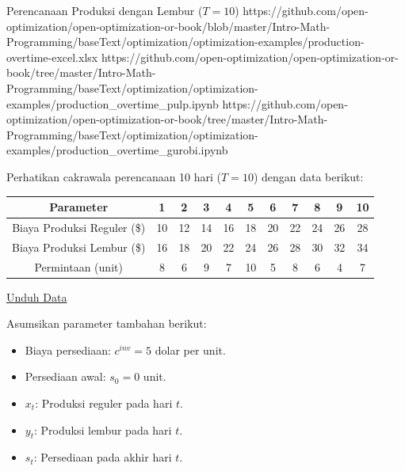 \begin{examplewithallcode}{Perencanaan Produksi dengan Lembur (\(T = 10\))}
{https://github.com/open-optimization/open-optimization-or-book/blob/master/Intro-Math-Programming/baseText/optimization/optimization-examples/production-overtime-excel.xlsx}
{https://github.com/open-optimization/open-optimization-or-book/tree/master/Intro-Math-Programming/baseText/optimization/optimization-examples/production_overtime_pulp.ipynb}
{https://github.com/open-optimization/open-optimization-or-book/tree/master/Intro-Math-Programming/baseText/optimization/optimization-examples/production_overtime_gurobi.ipynb}

Perhatikan cakrawala perencanaan 10 hari (\(T=10\)) dengan data berikut:


\begin{center}
\begin{tabular}{@{}c*{10}{c}@{}}
\toprule
\textbf{Parameter}                & 1   & 2   & 3   & 4   & 5   & 6   & 7   & 8   & 9   & 10 \\
\midrule
Biaya Produksi Reguler (\$)       & 10  & 12  & 14  & 16  & 18  & 20  & 22  & 24  & 26  & 28 \\
Biaya Produksi Lembur (\$)        & 16  & 18  & 20  & 22  & 24  & 26  & 28  & 30  & 32  & 34 \\
Permintaan (unit)                 & 8   & 6   & 9   & 7   & 10  & 5   & 8   & 6   & 4   & 7 \\
\bottomrule
\end{tabular}
\par{}\label{tab:modeling-sums-tab02}%
\href{https://github.com/open-optimization/open-optimization-or-book/blob/master/Intro-Math-Programming/baseText/optimization/optimization-examples/production_costs.xlsx}{Unduh Data}
\end{center}

Asumsikan parameter tambahan berikut:
\begin{itemize}
    \item Biaya persediaan: \( c^{inv} = 5 \) dolar per unit.
    \item Persediaan awal: \( s_0 = 0 \) unit.
\end{itemize}

\begin{itemize}
    \item \( x_t \): Produksi reguler pada hari \(t\).
    \item \( y_t \): Produksi lembur pada hari \(t\).
    \item \( s_t \): Persediaan pada akhir hari \(t\).
\end{itemize}


\end{examplewithallcode}
